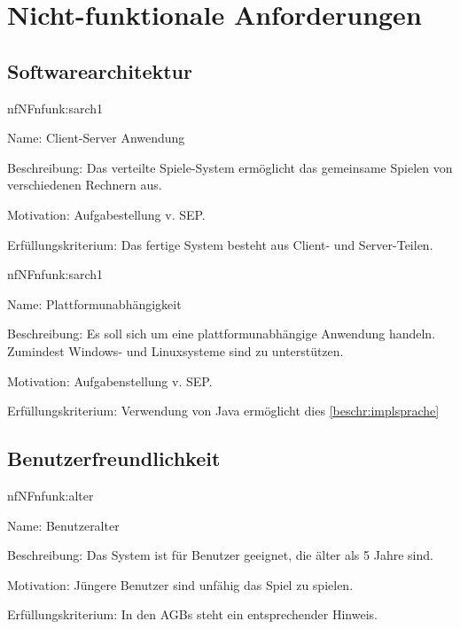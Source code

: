 \chapter{Nicht-funktionale Anforderungen}

\setcounter{nf}{10}

\section{Softwarearchitektur}

\begin{description}[leftmargin=5em, style=sameline]	
	\begin{lhp}{nf}{NF}{nfunk:sarch1}
		\item [Name:] Client-Server Anwendung
		\item [Beschreibung:] Das verteilte Spiele-System ermöglicht das gemeinsame Spielen von verschiedenen Rechnern aus.
		\item [Motivation:] Aufgabestellung v. SEP.
		\item [Erfüllungskriterium:] Das fertige System besteht aus Client- und Server-Teilen.
	\end{lhp}
	
	\begin{lhp}{nf}{NF}{nfunk:sarch1}
		\item [Name:] Plattformunabhängigkeit
		\item [Beschreibung:] Es soll sich um eine plattformunabhängige Anwendung handeln. Zumindest Windows- und Linuxsysteme sind zu unterstützen.
		\item [Motivation:] Aufgabenstellung v. SEP.
		\item [Erfüllungskriterium:] Verwendung von Java ermöglicht dies \ref{beschr:implsprache} %
	\end{lhp}
\end{description}



\section{Benutzerfreundlichkeit}


\begin{description}[leftmargin=5em, style=sameline]	
	\begin{lhp}{nf}{NF}{nfunk:alter}
		\item [Name:] Benutzeralter
		\item [Beschreibung:] Das System ist für Benutzer geeignet, die älter als 5 Jahre sind.
		\item [Motivation:] Jüngere Benutzer sind unfähig das Spiel zu spielen.
		\item [Erfüllungskriterium:] In den AGBs steht ein entsprechender Hinweis.
	\end{lhp}
\end{description}

